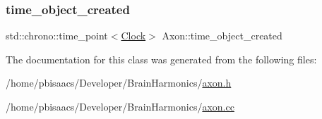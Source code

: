 \mbox{\label{classAxon_a01b83a46da58746087de2c6f1dd30405}} 
\subsubsection{\texorpdfstring{time\+\_\+object\+\_\+created}{time\_object\_created}}
{\footnotesize\ttfamily std\+::chrono\+::time\+\_\+point$<$\mbox{\hyperlink{universe_8h_a0ef8d951d1ca5ab3cfaf7ab4c7a6fd80}{Clock}}$>$ Axon\+::time\+\_\+object\+\_\+created\hspace{0.3cm}{\ttfamily [private]}}



The documentation for this class was generated from the following files\+:\begin{DoxyCompactItemize}
\item 
/home/pbisaacs/\+Developer/\+Brain\+Harmonics/\mbox{\hyperlink{axon_8h}{axon.\+h}}\item 
/home/pbisaacs/\+Developer/\+Brain\+Harmonics/\mbox{\hyperlink{axon_8cc}{axon.\+cc}}\end{DoxyCompactItemize}
